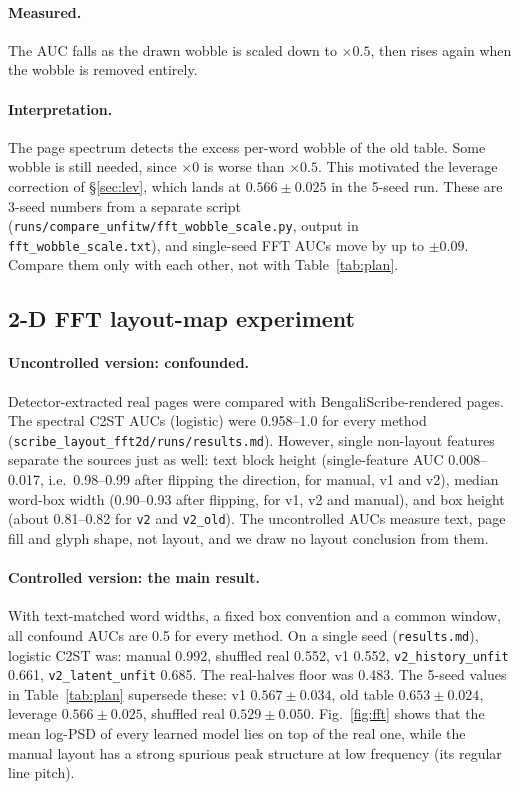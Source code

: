 \documentclass[11pt,a4paper]{article}
\newcommand{\src}[1]{{\footnotesize\texttt{#1}}}
\begin{document}
\paragraph{Measured.} The AUC falls as the drawn wobble is scaled down to
$\times0.5$, then rises again when the wobble is removed entirely.
\paragraph{Interpretation.} The page spectrum detects the excess per-word wobble
of the old table. Some wobble is still needed, since $\times0$ is worse than
$\times0.5$. This motivated the leverage correction of \S\ref{sec:lev}, which
lands at $0.566\pm0.025$ in the 5-seed run. These are 3-seed numbers from a
separate script (\src{runs/compare\_unfitw/fft\_wobble\_scale.py}, output in \src{fft\_wobble\_scale.txt}), and single-seed FFT AUCs move by up to
$\pm0.09$. Compare them only with each other, not with Table~\ref{tab:plan}.

\subsection{2-D FFT layout-map experiment}
\label{sec:fft2d}
\paragraph{Uncontrolled version: confounded.} Detector-extracted real pages were
compared with BengaliScribe-rendered pages. The spectral C2ST AUCs (logistic) were
0.958--1.0 for every method (\src{scribe\_layout\_fft2d/runs/results.md}).
However, single non-layout features separate the sources just as well: text
block height (single-feature AUC 0.008--0.017, i.e.\ 0.98--0.99 after flipping
the direction, for manual, v1 and v2), median word-box width (0.90--0.93 after
flipping, for v1, v2 and manual), and box height (about 0.81--0.82 for
\texttt{v2} and \texttt{v2\_old}). The uncontrolled AUCs measure text,
page fill and glyph shape, not layout, and we draw no layout conclusion from
them.

\paragraph{Controlled version: the main result.} With text-matched word widths,
a fixed box convention and a common window, all confound AUCs are 0.5 for
every method. On a single seed (\src{results.md}), logistic C2ST was: manual
0.992, shuffled real 0.552, v1 0.552, \texttt{v2\_history\_unfit} 0.661,
\texttt{v2\_latent\_unfit} 0.685. The real-halves floor was 0.483. The 5-seed
values in Table~\ref{tab:plan} supersede these: v1 $0.567\pm0.034$, old table
$0.653\pm0.024$, leverage $0.566\pm0.025$, shuffled real $0.529\pm0.050$.
Fig.~\ref{fig:fft} shows that the mean log-PSD of every learned model lies on
top of the real one, while the manual layout has a strong spurious peak
structure at low frequency (its regular line pitch).
\end{document}
